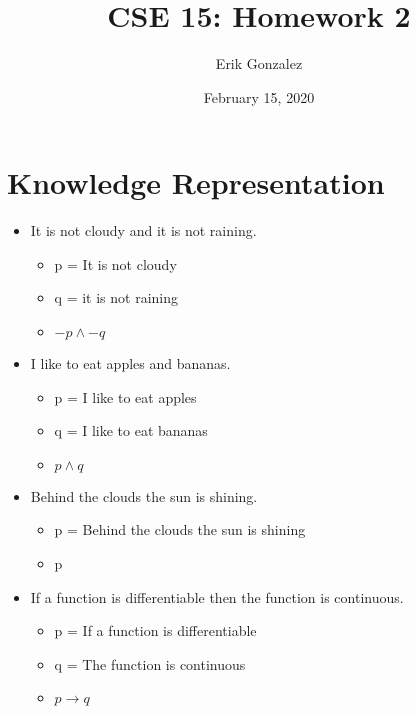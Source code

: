 \documentclass{article}
\title{CSE 15: Homework 2}
\author{Erik Gonzalez }
\date{February 15, 2020}
\begin{document}
\maketitle

\section*{Knowledge Representation}

\begin{itemize}
\item It is not cloudy and it is not raining. 

\begin{itemize}
    \item p = It is not cloudy 
    \item q = it is not raining
    \item $-p \wedge -q$
\end{itemize} 
\end{itemize}

\begin{itemize}
    \item I like to eat apples and bananas.
\begin{itemize}
    \item p = I like to eat apples
    \item q = I like to eat bananas
    \item $p \wedge q$
\end{itemize}
\end{itemize}


\begin{itemize}
    \item Behind the clouds the sun is shining.
\begin{itemize}
    \item p = Behind the clouds the sun is shining
    \item p
\end{itemize}
\end{itemize}
 
\begin{itemize}
    \item If a function is differentiable then the function is continuous.
\begin{itemize}
    \item p = If a function is differentiable 
    \item q = The function is continuous
    \item $p \to q$
\end{itemize}
\end{itemize}
\end{document}
